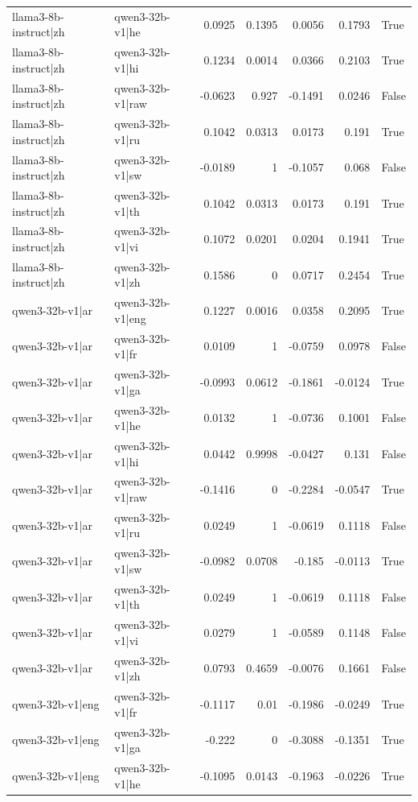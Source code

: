 \begin{table}
\begin{tabular}{l l r r r r l}
llama3-8b-instruct|zh & qwen3-32b-v1|he & 0.0925 & 0.1395 & 0.0056 & 0.1793 & True \\
llama3-8b-instruct|zh & qwen3-32b-v1|hi & 0.1234 & 0.0014 & 0.0366 & 0.2103 & True \\
llama3-8b-instruct|zh & qwen3-32b-v1|raw & -0.0623 & 0.927 & -0.1491 & 0.0246 & False \\
llama3-8b-instruct|zh & qwen3-32b-v1|ru & 0.1042 & 0.0313 & 0.0173 & 0.191 & True \\
llama3-8b-instruct|zh & qwen3-32b-v1|sw & -0.0189 & 1 & -0.1057 & 0.068 & False \\
llama3-8b-instruct|zh & qwen3-32b-v1|th & 0.1042 & 0.0313 & 0.0173 & 0.191 & True \\
llama3-8b-instruct|zh & qwen3-32b-v1|vi & 0.1072 & 0.0201 & 0.0204 & 0.1941 & True \\
llama3-8b-instruct|zh & qwen3-32b-v1|zh & 0.1586 & 0 & 0.0717 & 0.2454 & True \\
qwen3-32b-v1|ar & qwen3-32b-v1|eng & 0.1227 & 0.0016 & 0.0358 & 0.2095 & True \\
qwen3-32b-v1|ar & qwen3-32b-v1|fr & 0.0109 & 1 & -0.0759 & 0.0978 & False \\
qwen3-32b-v1|ar & qwen3-32b-v1|ga & -0.0993 & 0.0612 & -0.1861 & -0.0124 & True \\
qwen3-32b-v1|ar & qwen3-32b-v1|he & 0.0132 & 1 & -0.0736 & 0.1001 & False \\
qwen3-32b-v1|ar & qwen3-32b-v1|hi & 0.0442 & 0.9998 & -0.0427 & 0.131 & False \\
qwen3-32b-v1|ar & qwen3-32b-v1|raw & -0.1416 & 0 & -0.2284 & -0.0547 & True \\
qwen3-32b-v1|ar & qwen3-32b-v1|ru & 0.0249 & 1 & -0.0619 & 0.1118 & False \\
qwen3-32b-v1|ar & qwen3-32b-v1|sw & -0.0982 & 0.0708 & -0.185 & -0.0113 & True \\
qwen3-32b-v1|ar & qwen3-32b-v1|th & 0.0249 & 1 & -0.0619 & 0.1118 & False \\
qwen3-32b-v1|ar & qwen3-32b-v1|vi & 0.0279 & 1 & -0.0589 & 0.1148 & False \\
qwen3-32b-v1|ar & qwen3-32b-v1|zh & 0.0793 & 0.4659 & -0.0076 & 0.1661 & False \\
qwen3-32b-v1|eng & qwen3-32b-v1|fr & -0.1117 & 0.01 & -0.1986 & -0.0249 & True \\
qwen3-32b-v1|eng & qwen3-32b-v1|ga & -0.222 & 0 & -0.3088 & -0.1351 & True \\
qwen3-32b-v1|eng & qwen3-32b-v1|he & -0.1095 & 0.0143 & -0.1963 & -0.0226 & True \\

\end{tabular}
\end{table}
